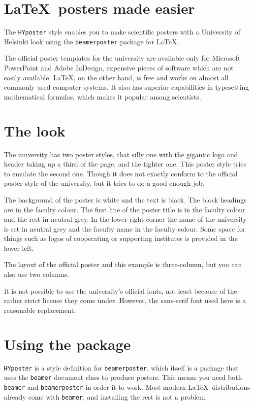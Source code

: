 \documentclass[final]{beamer}
\author{Olli Wilkman$^1$}
\institute{$^1$Department of Physics, \url{olli.wilkman@iki.fi}}
\begin{document}
\begin{poster}

\newcolumn

\section{\LaTeX~posters made easier}
The \texttt{HYposter} style enables you to make scientific posters with a University of Helsinki look using  the \texttt{beamerposter} package for \LaTeX. 

The official poster templates for the university are available only for Microsoft PowerPoint and Adobe InDesign, expensive pieces of software which are not easily available. \LaTeX, on the other hand, is free and works on almost all commonly used computer systems. It also has superior capabilities in typesetting mathematical formulas, which makes it popular among scientists.


\section{The look}
The university has two poster styles, that silly one with the gigantic logo and header taking up a third of the page, and the tighter one. This poster style tries to emulate the second one. Though it does not exactly conform to the official poster style of the university, but it tries to do a good enough job. 

The background of the poster is white and the text is black. The block headings are in the faculty colour. The first line of the poster title is in the faculty colour and the rest in neutral grey. In the lower right corner the name of the university is set in neutral grey and the faculty name in the faculty colour.
Some space for things such as logos of cooperating or supporting institutes is provided in the lower left.

The layout of the official poster and this example is three-column, but you can also use two columns.

It is not possible to use the university's official fonts, not least because of the rather strict license they come under. However, the sans-serif font used here is a reasonable replacement.


\section{Using the package}
\texttt{HYposter} is a style definition for \texttt{beamerposter}, which itself is a package that uses the \texttt{beamer} document class to produce posters. This means you need both \texttt{beamer} and \texttt{beamerposter} in order it to work. Most modern \LaTeX~distributions already come with \texttt{beamer}, and installing the rest is not a problem.


\end{poster}
\end{document}
